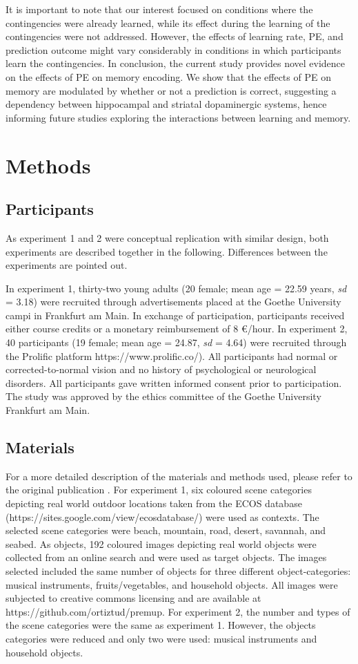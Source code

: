\documentclass[a4paper,12pt]{article}
\begin{document}
It is important to note that our interest focused on conditions where the contingencies were already learned, while its effect during the learning of the contingencies were not addressed. However, the effects of learning rate, PE, and prediction outcome might vary considerably in conditions in which participants learn the contingencies. 
In conclusion, the current study provides novel evidence on the effects of PE on memory encoding. We show that the effects of PE on memory are modulated by whether or not a prediction is correct, suggesting a dependency between hippocampal and striatal dopaminergic systems, hence informing future studies exploring the interactions between learning and memory. 


\section{Methods}
\subsection{Participants}
As experiment 1 and 2 were conceptual replication with similar design, both experiments are described together in the following. Differences between the experiments are pointed out. \par
In experiment 1, thirty-two young adults (20 female; mean age = 22.59 years, \textit{sd} = 3.18) were recruited through advertisements placed at the Goethe University campi in Frankfurt am Main. In exchange of participation, participants received either course credits or a monetary reimbursement of 8 €/hour. 
In experiment 2, 40 participants (19 female; mean age = 24.87, \textit{sd} = 4.64) were recruited through the Prolific platform https://www.prolific.co/). All participants had normal or corrected-to-normal vision and no history of psychological or neurological disorders. All participants gave written informed consent prior to participation. The study was approved by the ethics committee of the Goethe University Frankfurt am Main. 
\subsection{Materials}
For a more detailed description of the materials and methods used, please refer to the original publication \citep{ortiz2021not}. For experiment 1, six coloured scene categories depicting real world outdoor locations taken from the ECOS database (https://sites.google.com/view/ecosdatabase/) were used as contexts. The selected scene categories were beach, mountain, road, desert, savannah, and seabed. As objects, 192 coloured images depicting real world objects were collected from an online search and were used as target objects. The images selected included the same number of objects for three different object-categories: musical instruments, fruits/vegetables, and household objects. All images were subjected to creative commons licensing and are available at https://github.com/ortiztud/premup. 
For experiment 2, the number and types of the scene categories were the same as experiment 1. However, the objects categories were reduced and only two were used: musical instruments and household objects. 
\end{document}
